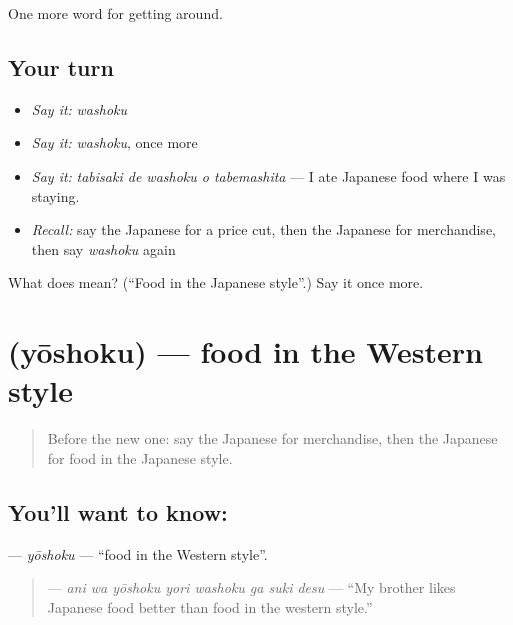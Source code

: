 \begin{grammarlens}[title={What you've built}]
One more word for getting around.
\end{grammarlens}

\subsection*{Your turn}
\begin{itemize}
\raggedright
  \item \emph{Say it:} \emph{washoku}
  \item \emph{Say it:} \emph{washoku}, once more
  \item \emph{Say it:} \emph{tabisaki de washoku o tabemashita} — I ate Japanese food where I was staying.
  \item \emph{Recall:} say the Japanese for a price cut, then the Japanese for merchandise, then say \emph{washoku} again
\end{itemize}

\begin{tcolorbox}[breakable,colback=teal!4,colframe=teal!35!black,title={Before you move on}]
What does  mean? (\textquotedblleft{}Food in the Japanese style\textquotedblright{}.) Say it once more.
\end{tcolorbox}
\section[\texorpdfstring{\ja{ようしょく} (yōshoku)}{ようしょく (yōshoku)}]{ (yōshoku) — food in the Western style}

\label{lesson:JA-C422-youshoku}



\begin{quote}
Before the new one: say the Japanese for merchandise, then the Japanese for food in the Japanese style.
\end{quote}

\subsection*{You'll want to know: }
\textbf{} — \emph{yōshoku} — \textquotedblleft{}food in the Western style\textquotedblright{}.

\begin{quote}
\textbf{   } — \emph{ani wa yōshoku yori washoku ga suki desu} — \textquotedblleft{}My brother likes Japanese food better than food in the western style.\textquotedblright{}
\end{quote}


